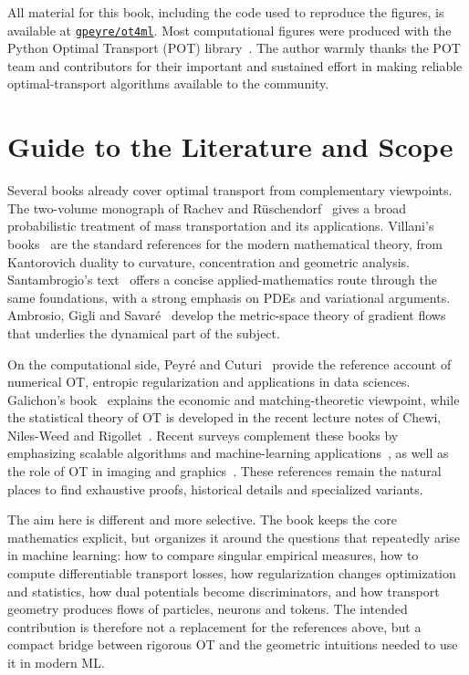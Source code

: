 \documentclass[10pt,a4paper,twoside,openany]{book}
\begin{document}
\noindent All material for this book, including the code used to reproduce the figures, is available at \href{http://github.com/gpeyre/ot4ml}{\texttt{gpeyre/ot4ml}}. Most computational figures were produced with the Python Optimal Transport (POT) library~\cite{flamary2021pot}. The author warmly thanks the POT team and contributors for their important and sustained effort in making reliable optimal-transport algorithms available to the community.

\chapter*{Guide to the Literature and Scope}

Several books already cover optimal transport from complementary viewpoints. The two-volume monograph of Rachev and R\"uschendorf~\cite{rachev1998mass,rachev1998mass2} gives a broad probabilistic treatment of mass transportation and its applications. Villani's books~\cite{Villani03,Villani09} are the standard references for the modern mathematical theory, from Kantorovich duality to curvature, concentration and geometric analysis. Santambrogio's text~\cite{SantambrogioBook} offers a concise applied-mathematics route through the same foundations, with a strong emphasis on PDEs and variational arguments. Ambrosio, Gigli and Savar\'e~\cite{ambrosio2006gradient} develop the metric-space theory of gradient flows that underlies the dynamical part of the subject.

On the computational side, Peyr\'e and Cuturi~\cite{peyre2019computational} provide the reference account of numerical OT, entropic regularization and applications in data sciences. Galichon's book~\cite{galichon2016optimal} explains the economic and matching-theoretic viewpoint, while the statistical theory of OT is developed in the recent lecture notes of Chewi, Niles-Weed and Rigollet~\cite{weed2025statistical}. Recent surveys complement these books by emphasizing scalable algorithms and machine-learning applications~\cite{khamis2024scalable,montesuma2023recent}, as well as the role of OT in imaging and graphics~\cite{bonneel2023survey}. These references remain the natural places to find exhaustive proofs, historical details and specialized variants.

The aim here is different and more selective. The book keeps the core mathematics explicit, but organizes it around the questions that repeatedly arise in machine learning: how to compare singular empirical measures, how to compute differentiable transport losses, how regularization changes optimization and statistics, how dual potentials become discriminators, and how transport geometry produces flows of particles, neurons and tokens. The intended contribution is therefore not a replacement for the references above, but a compact bridge between rigorous OT and the geometric intuitions needed to use it in modern ML.
\end{document}
